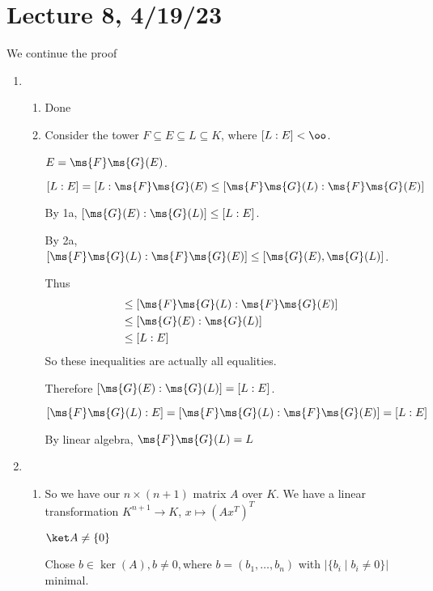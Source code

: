 \documentclass[x11names,reqno,14pt]{extarticle}
\begin{document}
\section*{Lecture 8, 4/19/23}

We continue the proof


\begin{enumerate}

\item 

\begin{enumerate}[label=(\alph*)]

\item Done

\item Consider the tower $F \subseteq E \subseteq L \subseteq K$, where $[L:E]<\oo$. 

$E = \ms{F}\ms{G}(E)$. 

$[L:E] = [L:\ms{F}\ms{G}(E) \leq [\ms{F}\ms{G}(L):\ms{F}\ms{G}(E)]$

By 1a, $[\ms{G}(E):\ms{G}(L)] \leq [L:E]$. 

By 2a, $[\ms{F}\ms{G}(L):\ms{F}\ms{G}(E)] \leq [\ms{G}(E), \ms{G}(L)]$. 

Thus 
\begin{align*}
[L:E] & \leq [\ms{F}\ms{G}(L): \ms{F}\ms{G}(E)] \\
& \leq [\ms{G}(E): \ms{G}(L)] \\
& \leq [L:E] \\
\end{align*}
So these inequalities are actually all equalities. 

Therefore $[\ms{G}(E):\ms{G}(L)] = [L:E]$. 

$[\ms{F}\ms{G}(L):E] = [\ms{F}\ms{G}(L):\ms{F}\ms{G}(E)] = [L:E]$

By linear algebra, $\ms{F}\ms{G}(L) = L$

\end{enumerate}

\item 

\begin{enumerate}[label=(\alph*)]

\item So we have our $n\times(n + 1)$ matrix $A$ over $K$. We have a linear transformation $K^{n + 1} \to K$, $x \mapsto (Ax^T)^T$

$\ket A \neq \{0\}$

Chose $b \in \ker(A), b \neq 0,$where $b = (b_1, \dots, b_n)$ with $|\{b_i \mid b_i \neq 0\}|$ minimal. 


\end{enumerate}
\end{enumerate}
\end{document}
